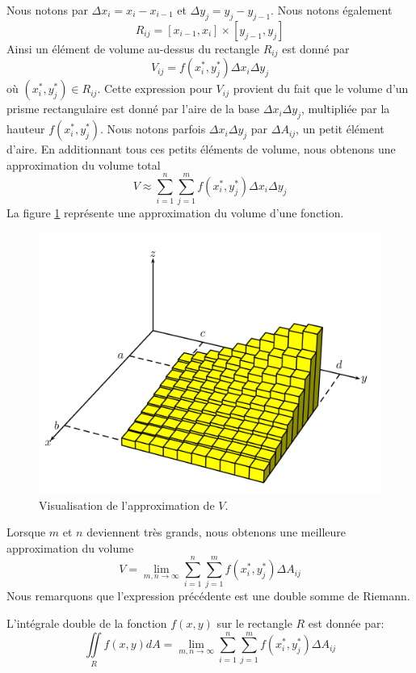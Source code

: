 \documentclass[]{book}
\theoremstyle{definition}
\theoremstyle{definition}
\theoremstyle{definition}
\theoremstyle{remark}
\let\BeginKnitrBlock\begin \let\EndKnitrBlock\end
\begin{document}
Nous notons par \(\Delta x_i=x_i-x_{i-1}\) et
\(\Delta y_j=y_j-y_{j-1}\). Nous notons également
\[R_{ij}=[x_{i-1},x_i]\times[y_{j-1},y_j]\] Ainsi un élément de volume
au-dessus du rectangle \(R_{ij}\) est donné par
\[V_{ij}=f(x_i^*,y_j^*)\Delta x_i\Delta y_j\] où
\((x_i^*,y_j^*)\in R_{ij}\). Cette expression pour \(V_{ij}\) provient
du fait que le volume d'un prisme rectangulaire est donné par l'aire de
la base \(\Delta x_i\Delta y_j\), multipliée par la hauteur
\(f(x_i^*,y_j^*)\). Nous notons parfois \(\Delta x_i\Delta y_j\) par
\(\Delta A_{ij}\), un petit élément d'aire. En additionnant tous ces
petits éléments de volume, nous obtenons une approximation du volume
total
\[V\approx \sum_{i=1}^{n}\sum_{j=1}^m f(x_i^*,y_j^*)\Delta x_i\Delta y_j\]
La figure \ref{fig:volumeR2} représente une approximation du volume
d'une fonction.

\begin{figure}

{\centering \includegraphics[width=0.9\linewidth]{resources/images/latex/volumeR2} 

}

\caption{Visualisation de l'approximation de $V$.}\label{fig:volumeR2}
\end{figure}

Lorsque \(m\) et \(n\) deviennent très grands, nous obtenons une
meilleure approximation du volume
\[V=\lim_{m,n\to\infty}\sum_{i=1}^{n}\sum_{j=1}^m f(x_i^*,y_j^*)\Delta A_{ij}\]
Nous remarquons que l'expression précédente est une double somme de
Riemann. \BeginKnitrBlock{definition}

\protect\hypertarget{def:int-double}{}{\label{def:int-double} }L'intégrale
double de la fonction \(f(x,y)\) sur le rectangle \(R\) est donnée par:
\[\iint\limits_R f(x,y)dA = \lim_{m,n\to\infty}\sum_{i=1}^{n}\sum_{j=1}^m f(x_i^*,y_j^*)\Delta A_{ij}\]
\EndKnitrBlock{definition}
\end{document}
